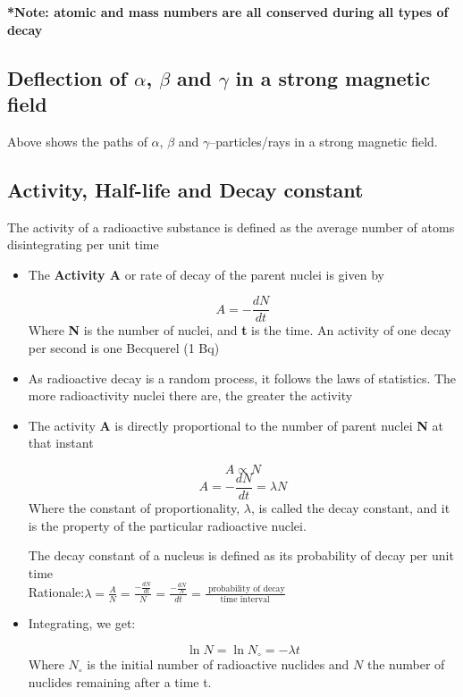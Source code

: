 {\textbf{*Note: atomic and mass numbers are all conserved during all types of decay}

\subsection{Deflection of $\alpha$, $\beta$ and $\gamma$ in a strong magnetic field}

Above shows the paths of $\alpha$, $\beta$ and $\gamma$--particles/rays in a strong magnetic field.
\subsection{Activity, Half-life and Decay constant}
\begin{defi}
The activity of a radioactive substance is defined as the average number of atoms disintegrating per unit time
\end{defi}

\begin{itemize}
\item The \textbf{Activity A} or rate of decay of the parent nuclei is given by
\begin{form}
$$A=-\frac{dN}{dt}$$
Where \textbf{N} is the number of nuclei, and \textbf{t} is the time. An activity of one decay per second is one Becquerel (1 Bq)
\end{form}
\item As radioactive decay is a random process, it follows the laws of statistics. The more radioactivity nuclei there are, the greater the activity
\item The activity \textbf{A} is directly proportional to the number of parent nuclei \textbf{N} at that instant
\begin{form}
$$A \propto N$$
$$ A= -\frac{dN}{dt} = \lambda N$$
Where the constant of proportionality, $\lambda$, is called the decay constant, and it is the property of the particular radioactive nuclei.
\end{form}
\begin{defi}
The decay constant of a nucleus is defined as its probability of decay per unit time\\[3pt]
Rationale:\qquad $\lambda = \frac{A}{N} = \frac{-\frac{dN}{dt}}{N} = \frac{-\frac{dN}{N}}{dt} = \frac{\text{ probability of decay}}{\text{time interval}}$
\end{defi}

\item Integrating, we get:
\begin{form}
$$\ln N = \ln N_\circ = -\lambda t$$
Where $N_\circ$ is the initial number of radioactive nuclides and $N$ the number of nuclides remaining after a time t.
\end{form}


\end{itemize}}
